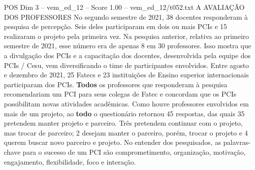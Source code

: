 \begin{textsample}{POS Dim 3 – vem\_ed\_12 – Score 1.00 – vem\_ed\_12/t052.txt}  \label{ex:f3_pos_043}
A AVALIAÇÃO DOS PROFESSORES No segundo semestre de 2021, 38 docentes responderam à pesquisa de percepção.
Seis deles participaram em dois ou mais PCIs e 15 realizaram o projeto pela primeira vez.
Na pesquisa anterior, relativa ao primeiro semestre de 2021, esse número era de apenas 8 em 30 professores.
Isso mostra que a divulgação dos PCIs e a capacitação dos docentes, desenvolvida pela equipe dos PCIs / Cesu, vem diversificando o time de participantes envolvidos.
Entre agosto e dezembro de 2021, 25 Fatecs e 23 instituições de Ensino superior internacionais participaram dos PCIs. \textbf{Todos} os professores que responderam à pesquisa recomendariam um PCI para seus colegas de Fatec e concordam que os PCIs possibilitam novas atividades acadêmicas.
Como houve professores envolvidos em mais de um projeto, ao \textbf{todo} o questionário retornou 45 respostas, das quais 35 pretendem manter projeto e parceiro.
Três pretendem continuar com o projeto, mas trocar de parceiro; 2 desejam manter o parceiro, porém, trocar o projeto e 4 querem buscar novo parceiro e projeto.
No entender dos pesquisados, as palavras-chave para o sucesso de um PCI são comprometimento, organização, motivação, engajamento, flexibilidade, foco e interação.

\end{textsample}

